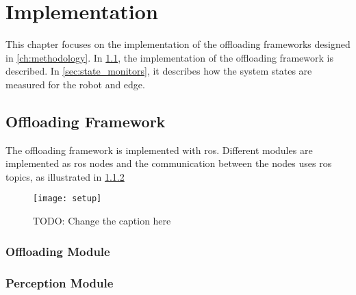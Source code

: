 \chapter{Implementation}\label{ch:implementation}

This chapter focuses on the implementation of the offloading frameworks designed in \cref{ch:methodology}. In \cref{sec:offloading_framework}, the implementation of the offloading framework is described. In \cref{sec:state_monitors}, it describes how the system states are measured for the robot and edge. 

\section{Offloading Framework}\label{sec:offloading_framework}

The offloading framework is implemented with \gls{ros}. Different modules are implemented as \gls{ros} nodes and the communication between the nodes uses \gls{ros} topics, as illustrated in \cref{}

\begin{figure}
    \centering
    \texttt{[image: setup]}  %
    \caption{TODO: Change the caption here}  %
    \label{fig:example_figure}  %
\end{figure}

\subsection{Offloading Module}


\subsection{Perception Module}



